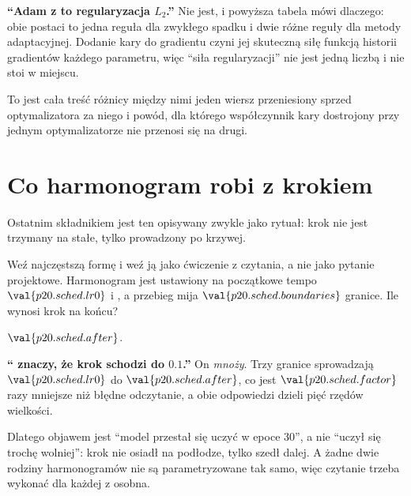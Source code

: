 \begin{fr}
\begin{trapbox}
\textbf{\enquote{Adam z  to regularyzacja $L_2$.}} Nie
jest, i powyższa tabela mówi dlaczego: obie postaci to jedna reguła dla
zwykłego spadku i dwie różne reguły dla metody adaptacyjnej. Dodanie kary do
gradientu czyni jej
skuteczną siłę funkcją historii gradientów każdego parametru, więc
\enquote{siła regularyzacji} nie jest jedną liczbą i nie stoi w miejscu.

To jest cała treść różnicy między nimi \dash{} jeden wiersz przeniesiony sprzed
optymalizatora za niego \dash{} i powód, dla którego współczynnik kary
dostrojony przy jednym optymalizatorze nie przenosi się na drugi.
\end{trapbox}
\end{fr}

\section{Co harmonogram robi z krokiem}
\label{sec:P20-schedules}

\begin{fr}
Ostatnim składnikiem jest ten opisywany zwykle jako rytuał: krok nie jest
trzymany na stałe, tylko prowadzony po krzywej.

Weź najczęstszą formę i weź ją jako ćwiczenie z czytania, a nie jako pytanie
projektowe. Harmonogram jest ustawiony na początkowe tempo
$\val{p20.sched.lr0}$ i , a przebieg mija
$\val{p20.sched.boundaries}$ granice. Ile wynosi krok na końcu?
\dotline
\nextframe
\end{fr}

\begin{fr}
\begin{ansblock}
$\val{p20.sched.after}$.
\end{ansblock}

\begin{trapbox}
\textbf{\enquote{ znaczy, że krok schodzi do $\num{0.1}$.}} On
\emph{mnoży}. Trzy granice sprowadzają $\val{p20.sched.lr0}$ do
$\val{p20.sched.after}$, co jest $\val{p20.sched.factor}$ razy mniejsze niż
błędne odczytanie, a obie odpowiedzi dzieli pięć rzędów wielkości.

Dlatego objawem jest \enquote{model przestał się uczyć w epoce $30$}, a nie
\enquote{uczył się trochę wolniej}: krok nie osiadł na podłodze, tylko szedł
dalej. A żadne dwie rodziny harmonogramów nie są parametryzowane tak samo, więc
czytanie trzeba wykonać dla każdej z osobna.
\end{trapbox}
\end{fr}

